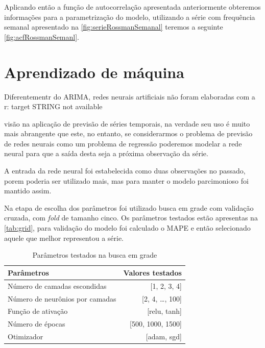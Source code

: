 \documentclass[
    12pt,
    oneside,
    a4paper,
    english,
    brazil
]{abntex2}
\begin{document}
Aplicando então a função de autocorrelação apresentada anteriormente obteremos
informações para a parametrização do modelo, utilizando a série com frequência
semanal apresentado na \autoref{fig:serieRossmanSemanal} teremos a seguinte
\autoref{fig:acfRossmanSemanl}.


\section{Aprendizado de máquina}

Diferentementr do ARIMA, redes neurais artificiais não foram elaboradas com a
r: target STRING not available

visão na aplicação de previsão de séries temporais, na verdade seu uso é muito
mais abrangente que este, no entanto, se considerarmos o problema de previsão
de redes neurais como um problema de regressão poderemos modelar a rede neural
para que a saída desta seja a próxima observação da série.

A entrada da rede neural foi estabelecida como duas observações no passado,
porem poderia ser utilizado mais, mas para manter o modelo parcimonioso foi
mantido assim.

Na etapa de escolha dos parâmetros foi utilizado busca em grade com validação
cruzada, com \textit{fold} de tamanho cinco. Os parâmetros testados estão
apresentas na \autoref{tab:grid}, para validação do modelo foi calculado o MAPE
e então selecionado aquele que melhor representou a série.

\begin{table}
    \centering
    \caption{Parâmetros testados na busca em grade}\label{tab:grid}
    \begin{tabular}{ l r }
        \toprule
        Parâmetros                      & Valores testados\\
        \midrule
        Número de camadas escondidas    & [1, 2, 3, 4]\\
        Número de neurônios por camadas & [2, 4, \ldots, 100]\\
        Função de ativação              & [relu, tanh]\\
        Número de épocas                & [500, 1000, 1500]\\
        Otimizador                      & [adam, sgd]\\
        \bottomrule
    \end{tabular}
\end{table}
\end{document}
